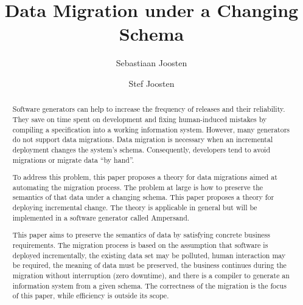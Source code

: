 \documentclass[runningheads]{llncs}
\begin{document}
%

\title{Data Migration under a Changing Schema}
%
%
\author{Sebastiaan Joosten\\ \and
Stef Joosten}
%
%
%
\maketitle              %
%
\begin{abstract}
Software generators can help to increase the frequency of releases and their reliability. They save on time spent on development and fixing human-induced mistakes by compiling a specification into a working information system. However, many generators do not support data migrations. Data migration is necessary when an incremental deployment changes the system's schema. Consequently, developers tend to avoid migrations or migrate data ``by hand''.

To address this problem, this paper proposes a theory for data migrations aimed at automating the migration process. The problem at large is how to preserve the semantics of that data under a changing schema. This paper proposes a theory for deploying incremental change. The theory is applicable in general but will be implemented in a software generator called Ampersand.

This paper aims to preserve the semantics of data by satisfying concrete business requirements. The migration process is based on the assumption that software is deployed incrementally, the existing data set may be polluted, human interaction may be required, the meaning of data must be preserved, the business continues during the migration without interruption (zero downtime), and there is a compiler to generate an information system from a given schema. The correctness of the migration is the focus of this paper, while efficiency is outside its scope.

\end{abstract}
%
%
%
\end{document}
